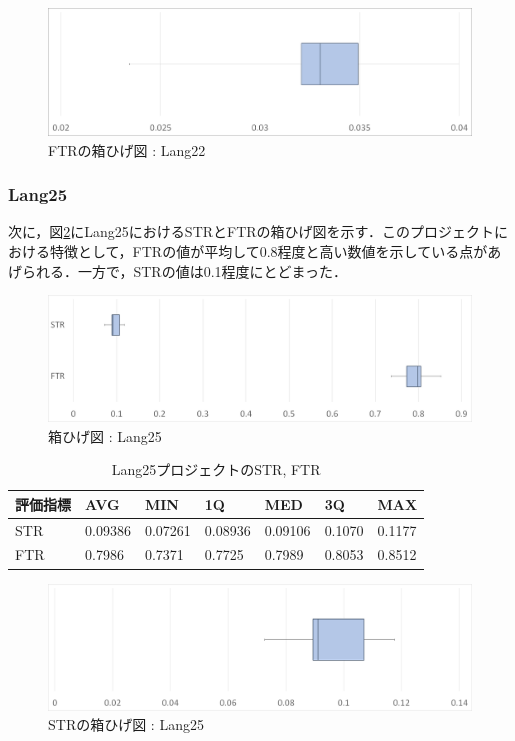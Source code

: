 \documentclass[uplatex,dvipdfmx,a4paper]{jsarticle}
\begin{document}
\begin{figure}[t]
  \centering
  \includegraphics[width=\linewidth]{fig/Lang22_boxplot_FTR.png}
  \caption{FTRの箱ひげ図 : Lang22}
  \label{fig:Lang22_boxplot_FTR}
\end{figure}
\subsubsection{Lang25}
次に，図\ref{fig:Lang25_boxplot}にLang25におけるSTRとFTRの箱ひげ図を示す．このプロジェクトにおける特徴として，FTRの値が平均して0.8程度と高い数値を示している点があげられる．一方で，STRの値は0.1程度にとどまった．
\begin{figure}[t]
  \centering
  \includegraphics[width=\linewidth]{fig/Lang25_boxplot.png}
  \caption{箱ひげ図 : Lang25}
  \label{fig:Lang25_boxplot}
\end{figure}
\begin{table}[b]
  \centering
  \caption{Lang25プロジェクトのSTR, FTR}
  \label{tab:Lang25}
  \begin{tabular}{l|llllll} \hline\hline
    評価指標 & AVG         & MIN & 1Q & MED & 3Q & MAX   \\\hline
    STR & 0.09386 & 0.07261 & 0.08936 & 0.09106 & 0.1070 & 0.1177  \\
    FTR & 0.7986 & 0.7371 & 0.7725 & 0.7989 & 0.8053 & 0.8512 \\\hline\hline
  \end{tabular}
\end{table}
\begin{figure}[t]
  \centering
  \includegraphics[width=\linewidth]{fig/Lang25_boxplot_STR.png}
  \caption{STRの箱ひげ図 : Lang25}
  \label{fig:Lang25_boxplot_STR}
\end{figure}
\end{document}
